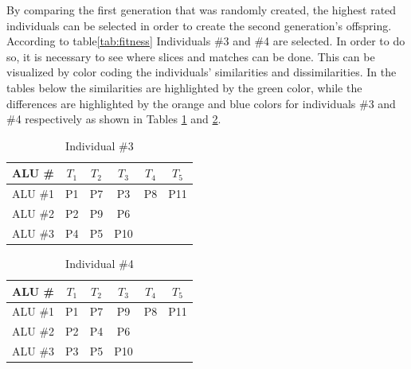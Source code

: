 \documentclass[conference]{IEEEtran}
\begin{document}
By comparing the first generation that was randomly created, the highest rated individuals can be selected in order to create the second generation's offspring. According to table\ref{tab:fitness} Individuals \#3 and \#4 are selected. In order to do so, it is necessary to see where slices and matches can be done. This can be visualized by color coding the individuals' similarities and dissimilarities. In the tables below the similarities are highlighted by the green color, while the differences are highlighted by the orange and blue colors for individuals  \#3 and \#4 respectively as shown in Tables \ref{tab:Individual3-colored} and \ref{tab:Individual4-colored}. 
\begin{table}[h!]
    \centering
    \begin{tabular}{|c|c|c|c|c|c|}
        \hline
    ALU \#  & $T_1$ & $T_2$ &  $T_3$& $T_4$ & $T_5$ \\
    \hline
       ALU \#1  &\cellcolor[HTML]{51C004} P1 &\cellcolor[HTML]{51C004} P7 &\cellcolor[HTML]{D67D03}  P3& \cellcolor[HTML]{51C004}P8 & \cellcolor[HTML]{51C004}P11\\
       \hline
       ALU \#2  &  \cellcolor[HTML]{51C004}P2 & \cellcolor[HTML]{D67D03}P9 & \cellcolor[HTML]{51C004}P6 &  &\\
       \hline
       ALU \#3  &\cellcolor[HTML]{D67D03} P4 & \cellcolor[HTML]{51C004}P5  & \cellcolor[HTML]{51C004}P10 &  & \\
       \hline
    \end{tabular}
           \vspace{2pt}
    \caption{Individual \#3}
    \label{tab:Individual3-colored}
\end{table}
\begin{table}[h!]
    \centering
    \begin{tabular}{|c|c|c|c|c|c|}
    \hline
    ALU \#  & $T_1$ & $T_2$ &  $T_3$& $T_4$ & $T_5$ \\
        \hline
       ALU \#1  & \cellcolor[HTML]{51C004}P1 &\cellcolor[HTML]{51C004} P7 & \cellcolor[HTML]{0079EA} P9&\cellcolor[HTML]{51C004} P8 &\cellcolor[HTML]{51C004} P11\\
       \hline
       ALU \#2  & \cellcolor[HTML]{51C004} P2 &\cellcolor[HTML]{0079EA} P4 & \cellcolor[HTML]{51C004}P6 &  &\\
       \hline
       ALU \#3  &\cellcolor[HTML]{0079EA} P3 & \cellcolor[HTML]{51C004}P5  &\cellcolor[HTML]{51C004} P10 &  & \\
       \hline
    \end{tabular}
           \vspace{2pt}
    \caption{Individual \#4}
    \label{tab:Individual4-colored}
\end{table}
\end{document}
